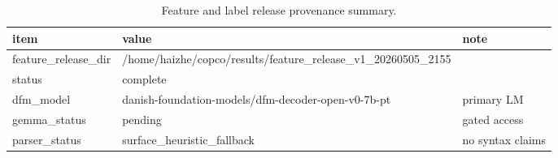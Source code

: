 \begin{table}[t]
\centering
\small
\caption{Feature and label release provenance summary.}
\label{tab:feature-label-release}
\begin{tabular}{lll}
\toprule
item & value & note \\
\midrule
feature\_release\_dir & /home/haizhe/copco/results/feature\_release\_v1\_20260505\_2155 &  \\
status & complete &  \\
dfm\_model & danish-foundation-models/dfm-decoder-open-v0-7b-pt & primary LM \\
gemma\_status & pending & gated access \\
parser\_status & surface\_heuristic\_fallback & no syntax claims \\
\bottomrule
\end{tabular}
\end{table}
